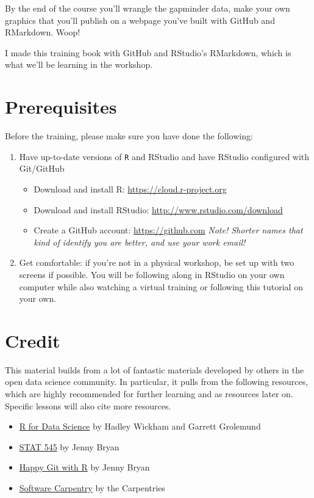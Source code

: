 \documentclass[]{book}
\providecommand{\tightlist}{%
  \setlength{\itemsep}{0pt}\setlength{\parskip}{0pt}}
\theoremstyle{definition}
\theoremstyle{definition}
\theoremstyle{definition}
\theoremstyle{remark}
\begin{document}
By the end of the course you'll wrangle the gapminder data, make your
own graphics that you'll publish on a webpage you've built with GitHub
and RMarkdown. Woop!

I made this training book with GitHub and RStudio's RMarkdown, which is
what we'll be learning in the workshop.

\section{Prerequisites}\label{prerequisites}

Before the training, please make sure you have done the following:

\begin{enumerate}
\def\labelenumi{\arabic{enumi}.}
\tightlist
\item
  Have up-to-date versions of \texttt{R} and RStudio and have RStudio
  configured with Git/GitHub

  \begin{itemize}
  \tightlist
  \item
    Download and install R: \url{https://cloud.r-project.org}
  \item
    Download and install RStudio: \url{http://www.rstudio.com/download}
  \item
    Create a GitHub account: \url{https://github.com} \emph{Note!
    Shorter names that kind of identify you are better, and use your
    work email!}
  \end{itemize}
\item
  Get comfortable: if you're not in a physical workshop, be set up with
  two screens if possible. You will be following along in RStudio on
  your own computer while also watching a virtual training or following
  this tutorial on your own.
\end{enumerate}

\section{Credit}\label{credit}

This material builds from a lot of fantastic materials developed by
others in the open data science community. In particular, it pulls from
the following resources, which are highly recommended for further
learning and as resources later on. Specific lessons will also cite more
resources.

\begin{itemize}
\tightlist
\item
  \href{http://r4ds.had.co.nz/}{R for Data Science} by Hadley Wickham
  and Garrett Grolemund
\item
  \href{http://stat545.com/}{STAT 545} by Jenny Bryan
\item
  \href{http://happygitwithr.com}{Happy Git with R} by Jenny Bryan
\item
  \href{https://software-carpentry.org/lessons/}{Software Carpentry} by
  the Carpentries
\end{itemize}
\end{document}
